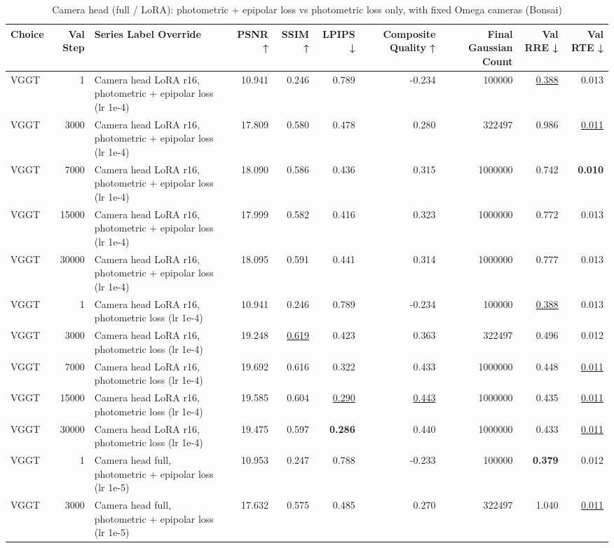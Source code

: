 \begin{table}[H]
\caption{\ifdefined\customcaption \customcaption \else Camera head (full / LoRA): photometric + epipolar loss vs photometric loss only, with fixed Omega cameras (Bonsai) \fi}
\label{tab:115_omega_epi_heads_bonsai}
\centering
\tiny
\begin{tabular}{lrlrrrrrrr}
\toprule
Choice & Val Step & Series Label Override & PSNR ↑ & SSIM ↑ & LPIPS ↓ & Composite Quality ↑ & Final Gaussian Count & Val RRE ↓ & Val RTE ↓ \\
\midrule
VGGT & 1 & Camera head LoRA r16, photometric + epipolar loss (lr 1e-4) & 10.941 & 0.246 & 0.789 & -0.234 & 100000 & \underline{0.388} & 0.013 \\
VGGT & 3000 & Camera head LoRA r16, photometric + epipolar loss (lr 1e-4) & 17.809 & 0.580 & 0.478 & 0.280 & 322497 & 0.986 & \underline{0.011} \\
VGGT & 7000 & Camera head LoRA r16, photometric + epipolar loss (lr 1e-4) & 18.090 & 0.586 & 0.436 & 0.315 & 1000000 & 0.742 & \textbf{0.010} \\
VGGT & 15000 & Camera head LoRA r16, photometric + epipolar loss (lr 1e-4) & 17.999 & 0.582 & 0.416 & 0.323 & 1000000 & 0.772 & 0.013 \\
VGGT & 30000 & Camera head LoRA r16, photometric + epipolar loss (lr 1e-4) & 18.095 & 0.591 & 0.441 & 0.314 & 1000000 & 0.777 & 0.013 \\
VGGT & 1 & Camera head LoRA r16, photometric loss (lr 1e-4) & 10.941 & 0.246 & 0.789 & -0.234 & 100000 & \underline{0.388} & 0.013 \\
VGGT & 3000 & Camera head LoRA r16, photometric loss (lr 1e-4) & 19.248 & \underline{0.619} & 0.423 & 0.363 & 322497 & 0.496 & 0.012 \\
VGGT & 7000 & Camera head LoRA r16, photometric loss (lr 1e-4) & 19.692 & 0.616 & 0.322 & 0.433 & 1000000 & 0.448 & \underline{0.011} \\
VGGT & 15000 & Camera head LoRA r16, photometric loss (lr 1e-4) & 19.585 & 0.604 & \underline{0.290} & \underline{0.443} & 1000000 & 0.435 & \underline{0.011} \\
VGGT & 30000 & Camera head LoRA r16, photometric loss (lr 1e-4) & 19.475 & 0.597 & \textbf{0.286} & 0.440 & 1000000 & 0.433 & \underline{0.011} \\
VGGT & 1 & Camera head full, photometric + epipolar loss (lr 1e-5) & 10.953 & 0.247 & 0.788 & -0.233 & 100000 & \textbf{0.379} & 0.012 \\
VGGT & 3000 & Camera head full, photometric + epipolar loss (lr 1e-5) & 17.632 & 0.575 & 0.485 & 0.270 & 322497 & 1.040 & \underline{0.011} \\

\end{tabular}
\end{table}
